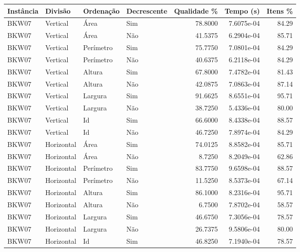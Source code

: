 \begin{tabular}{llllrrr}
\hline
Instância & Divisão     & Ordenação & Decrescente & Qualidade \% & Tempo (s)  & Itens \% \\
\hline
BKW07     & Vertical    & Área      & Sim         & 78.8000      & 7.6075e-04 & 84.29    \\
BKW07     & Vertical    & Área      & Não         & 41.5375      & 6.2904e-04 & 85.71    \\
BKW07     & Vertical    & Perímetro & Sim         & 75.7750      & 7.0801e-04 & 84.29    \\
BKW07     & Vertical    & Perímetro & Não         & 40.6375      & 6.2118e-04 & 84.29    \\
BKW07     & Vertical    & Altura    & Sim         & 67.8000      & 7.4782e-04 & 81.43    \\
BKW07     & Vertical    & Altura    & Não         & 42.0875      & 7.0863e-04 & 87.14    \\
BKW07     & Vertical    & Largura   & Sim         & 91.6625      & 8.6551e-04 & 95.71    \\
BKW07     & Vertical    & Largura   & Não         & 38.7250      & 5.4336e-04 & 80.00    \\
BKW07     & Vertical    & Id        & Sim         & 66.6000      & 8.4338e-04 & 88.57    \\
BKW07     & Vertical    & Id        & Não         & 46.7250      & 7.8974e-04 & 84.29    \\
BKW07     & Horizontal  & Área      & Sim         & 74.0125      & 8.8582e-04 & 85.71    \\
BKW07     & Horizontal  & Área      & Não         & 8.7250       & 8.2049e-04 & 62.86    \\
BKW07     & Horizontal  & Perímetro & Sim         & 83.7750      & 9.6598e-04 & 88.57    \\
BKW07     & Horizontal  & Perímetro & Não         & 11.5250      & 8.5373e-04 & 67.14    \\
BKW07     & Horizontal  & Altura    & Sim         & 86.1000      & 8.2316e-04 & 95.71    \\
BKW07     & Horizontal  & Altura    & Não         & 6.7500       & 7.8702e-04 & 58.57    \\
BKW07     & Horizontal  & Largura   & Sim         & 46.6750      & 7.3056e-04 & 78.57    \\
BKW07     & Horizontal  & Largura   & Não         & 26.7375      & 9.5806e-04 & 80.00    \\
BKW07     & Horizontal  & Id        & Sim         & 46.8250      & 7.1940e-04 & 78.57    \\

\end{tabular}
